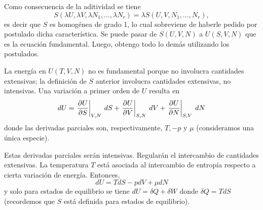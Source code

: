 \documentclass[10pt,oneside]{CBFT_book}
\begin{document}
Como consecuencia de la aditividad se tiene
\[
	S(\lambda U, \lambda V, \lambda N_1, ..., \lambda N_r ) =
	\lambda S(U,V,N_1,...,N_r),
\]
es decir que $S$ es homogénea de grado 1, lo cual sobreviene de haberle pedido por postulado dicha
característica. Se puede pasar de $S(U,V,N)$ a $U(S,V,N)$ que es la ecuación fundamental.
Luego, obtengo todo lo demás utilizando los postulados.

La energía en $U(T,V,N)$ no es fundamental porque no involucra cantidades extensivas; la definición
de $S$ anterior involucra cantidades extensivas, no intensivas.
Una variación a primer orden de $U$ resulta en
\[
	dU = \left.\frac{\partial^{\hspace{-0.05em}} {U}}{\partial {S}^{\hspace{-0.05em}}}\right|_{V,N} \: dS + \left.\frac{\partial^{\hspace{-0.05em}} {U}}{\partial {V}^{\hspace{-0.05em}}}\right|_{S,N} \: dV + \left.\frac{\partial^{\hspace{-0.05em}} {U}}{\partial {N}^{\hspace{-0.05em}}}\right|_{S,V} \: dN
\]
donde las derivadas parciales son, respectivamente, $T,-p$ y $\mu$ (consideramos una única especie).

Estas derivadas parciales serán intensivas. Regularán el intercambio de cantidades extensivas.
La temperatura $T$ está asociada al intercambio de entropía respecto a cierta variación de energía.
Entonces,
\[
	dU = TdS - p dV + \mu dN
\]
y solo para estados de equilibrio se tiene $dU = \delta Q + \delta W$ donde $\delta Q = T dS$ (recordemos
que $S$ está definida para estados de equilibrio).
\end{document}
